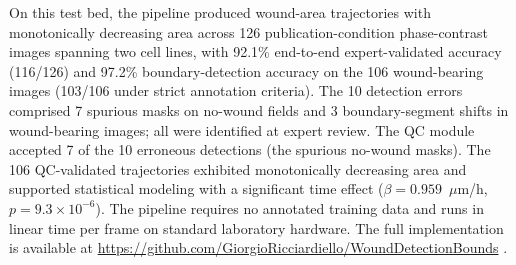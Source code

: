 On this test bed, the pipeline produced wound-area trajectories with monotonically decreasing area across 126 publication-condition phase-contrast images spanning two cell lines, with 92.1\% end-to-end expert-validated accuracy (116/126) and 97.2\% boundary-detection accuracy on the 106 wound-bearing images (103/106 under strict annotation criteria). The 10 detection errors comprised 7 spurious masks on no-wound fields and 3 boundary-segment shifts in wound-bearing images; all were identified at expert review. The QC module accepted 7 of the 10 erroneous detections (the spurious no-wound masks). The 106 QC-validated trajectories exhibited monotonically decreasing area and supported statistical modeling with a significant time effect ($\beta = 0.959$~$\mu$m/h, $p = 9.3 \times 10^{-6}$). The pipeline requires no annotated training data and runs in linear time per frame on standard laboratory hardware. The full implementation is available at \url{https://github.com/GiorgioRicciardiello/WoundDetectionBounds} \citep{Ricciardiello2025code}.

